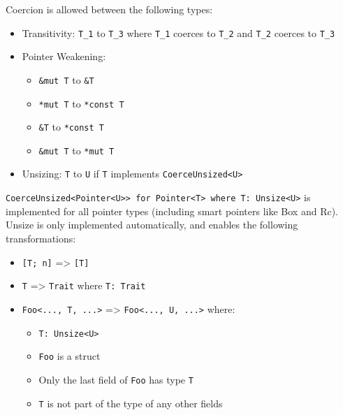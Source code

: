 \documentclass[a4paper,]{book}
\providecommand{\tightlist}{%
  \setlength{\itemsep}{0pt}\setlength{\parskip}{0pt}}
\begin{document}
Coercion is allowed between the following types:

\begin{itemize}
\tightlist
\item
  Transitivity: \texttt{T\_1} to \texttt{T\_3} where \texttt{T\_1}
  coerces to \texttt{T\_2} and \texttt{T\_2} coerces to \texttt{T\_3}
\item
  Pointer Weakening:

  \begin{itemize}
  \tightlist
  \item
    \texttt{\&mut\ T} to \texttt{\&T}
  \item
    \texttt{*mut\ T} to \texttt{*const\ T}
  \item
    \texttt{\&T} to \texttt{*const\ T}
  \item
    \texttt{\&mut\ T} to \texttt{*mut\ T}
  \end{itemize}
\item
  Unsizing: \texttt{T} to \texttt{U} if \texttt{T} implements
  \texttt{CoerceUnsized\textless{}U\textgreater{}}
\end{itemize}

\texttt{CoerceUnsized\textless{}Pointer\textless{}U\textgreater{}\textgreater{}\ for\ Pointer\textless{}T\textgreater{}\ where\ T:\ Unsize\textless{}U\textgreater{}}
is implemented for all pointer types (including smart pointers like Box
and Rc). Unsize is only implemented automatically, and enables the
following transformations:

\begin{itemize}
\tightlist
\item
  \texttt{{[}T;\ n{]}} =\textgreater{} \texttt{{[}T{]}}
\item
  \texttt{T} =\textgreater{} \texttt{Trait} where \texttt{T:\ Trait}
\item
  \texttt{Foo\textless{}...,\ T,\ ...\textgreater{}} =\textgreater{}
  \texttt{Foo\textless{}...,\ U,\ ...\textgreater{}} where:

  \begin{itemize}
  \tightlist
  \item
    \texttt{T:\ Unsize\textless{}U\textgreater{}}
  \item
    \texttt{Foo} is a struct
  \item
    Only the last field of \texttt{Foo} has type \texttt{T}
  \item
    \texttt{T} is not part of the type of any other fields
  \end{itemize}
\end{itemize}
\end{document}
